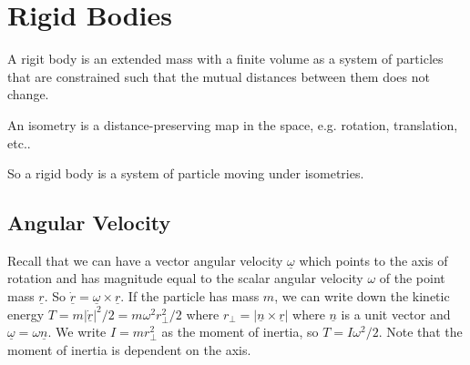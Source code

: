 \section{Rigid Bodies}
\begin{definition}
    A rigit body is an extended mass with a finite volume as a system of particles that are constrained such that the mutual distances between them does not change.
\end{definition}
\begin{definition}
    An isometry is a distance-preserving map in the space, e.g. rotation, translation, etc..
\end{definition}
So a rigid body is a system of particle moving under isometries.
\subsection{Angular Velocity}
Recall that we can have a vector angular velocity $\underline{\omega}$ which points to the axis of rotation and has magnitude equal to the scalar angular velocity $\omega$ of the point mass $\underline{r}$.
So $\underline{\dot{r}}=\underline{\omega}\times\underline{r}$.
If the particle has mass $m$, we can write down the kinetic energy $T=m|\underline{\dot{r}}|^2/2=m\omega^2r_\perp^2/2$ where $r_\perp=|\underline{n}\times\underline{r}|$ where $\underline{n}$ is a unit vector and $\underline{\omega}=\omega\underline{n}$.
We write $I=mr_\perp^2$ as the moment of inertia, so $T=I\omega^2/2$.
Note that the moment of inertia is dependent on the axis.
